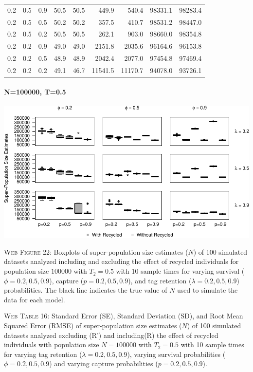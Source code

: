 \documentclass[]{article}
\let\oldparagraph\paragraph
\renewcommand{\paragraph}[1]{\oldparagraph{#1}\mbox{}}
\begin{document}
\begin{table}[ht]
{\begin{tabular}{rrrrrrrrr}
  0.2 & 0.5 & 0.9 & 50.5 & 50.5 & 449.9 & 540.4 & 98331.1 & 98283.4 \\ 
  0.2 & 0.5 & 0.5 & 50.2 & 50.2 & 357.5 & 410.7 & 98531.2 & 98447.0 \\ 
  0.2 & 0.5 & 0.2 & 50.5 & 50.5 & 262.1 & 903.0 & 98660.0 & 98354.8 \\ 
  0.2 & 0.2 & 0.9 & 49.0 & 49.0 & 2151.8 & 2035.6 & 96164.6 & 96153.8 \\ 
  0.2 & 0.2 & 0.5 & 48.9 & 48.9 & 2042.4 & 2077.0 & 97454.8 & 97469.4 \\ 
  0.2 & 0.2 & 0.2 & 49.1 & 46.7 & 11541.5 & 11170.7 & 94078.0 & 93726.1 \\ 
   \hline
\end{tabular}
}
\endgroup
\end{table}

\newpage

\paragraph{N=100000, T=0.5}\label{n100000-t0.5-4}

\includegraphics{Appendix_BW_files/figure-latex/figure22_superN_GJSTL3-1.pdf}

\textsc{Web Figure 22:} Boxplots of super-population size estimates
(\(N\)) of 100 simulated datasets analyzed including and excluding the effect
of recycled individuals for population size \(100000\) with \(T_2=0.5\)
with 10 sample times for varying survival (\(\phi=0.2,0.5,0.9\)),
capture (\(p=0.2,0.5,0.9\)), and tag retention (\(\lambda=0.2,0.5,0.9\))
probabilities. The black line indicates the true value of \(N\) used to
simulate the data for each model.

\textsc{Web Table 16:} Standard Error (SE), Standard Deviation (SD), and
Root Mean Squared Error (RMSE) of super-population size estimates
(\(N\)) of 100 simulated datasets analyzed excluding (R') and including(R) the
effect of recycled individuals with population size \(N=100000\) with
\(T_2=0.5\) with 10 sample times for varying tag retention
(\(\lambda=0.2,0.5,0.9\)), varying survival probabilities
(\(\phi=0.2,0.5,0.9\)) and varying capture probabilities
(\(p=0.2,0.5,0.9\)).
\end{document}
